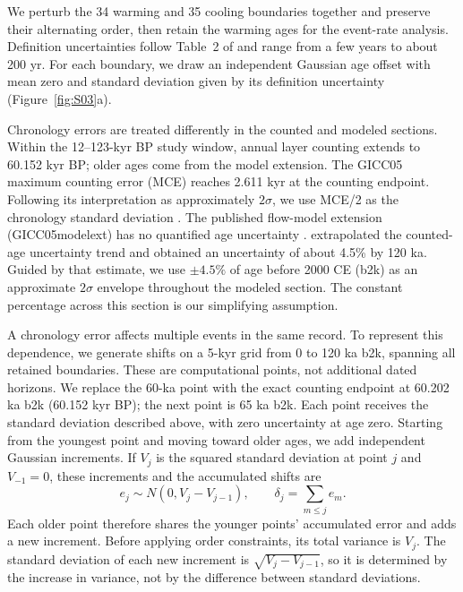 \documentclass[11pt]{article}
\begin{document}
We perturb the 34 warming and 35 cooling boundaries together and preserve their alternating order, then retain the warming ages for the event-rate analysis. Definition uncertainties follow Table~2 of \citet{rasmussen2014stratigraphic} and range from a few years to about 200 yr. For each boundary, we draw an independent Gaussian age offset with mean zero and standard deviation given by its definition uncertainty (Figure~\ref{fig:S03}a).

Chronology errors are treated differently in the counted and modeled sections. Within the 12--123-kyr BP study window, annual layer counting extends to 60.152 kyr BP; older ages come from the model extension. The GICC05 maximum counting error (MCE) reaches 2.611 kyr at the counting endpoint. Following its interpretation as approximately $2\sigma$, we use MCE/2 as the chronology standard deviation \citep{svensson2008sixty,rasmussen2022gicc05}. The published flow-model extension (GICC05modelext) has no quantified age uncertainty \citep{corrick2020synchronous}. \citet{moseley2020nalps19} extrapolated the counted-age uncertainty trend and obtained an uncertainty of about 4.5\% by 120 ka. Guided by that estimate, we use $\pm4.5\%$ of age before 2000 CE (b2k) as an approximate $2\sigma$ envelope throughout the modeled section. The constant percentage across this section is our simplifying assumption.

A chronology error affects multiple events in the same record. To represent this dependence, we generate shifts on a 5-kyr grid from 0 to 120 ka b2k, spanning all retained boundaries. These are computational points, not additional dated horizons. We replace the 60-ka point with the exact counting endpoint at 60.202 ka b2k (60.152 kyr BP); the next point is 65 ka b2k. Each point receives the standard deviation described above, with zero uncertainty at age zero. Starting from the youngest point and moving toward older ages, we add independent Gaussian increments. If $V_j$ is the squared standard deviation at point $j$ and $V_{-1}=0$, these increments and the accumulated shifts are
\begin{equation}
 e_j\sim N(0,V_j-V_{j-1}),\qquad \delta_j=\sum_{m\leq j}e_m.
\end{equation}
Each older point therefore shares the younger points' accumulated error and adds a new increment. Before applying order constraints, its total variance is $V_j$. The standard deviation of each new increment is $\sqrt{V_j-V_{j-1}}$, so it is determined by the increase in variance, not by the difference between standard deviations.
\end{document}

